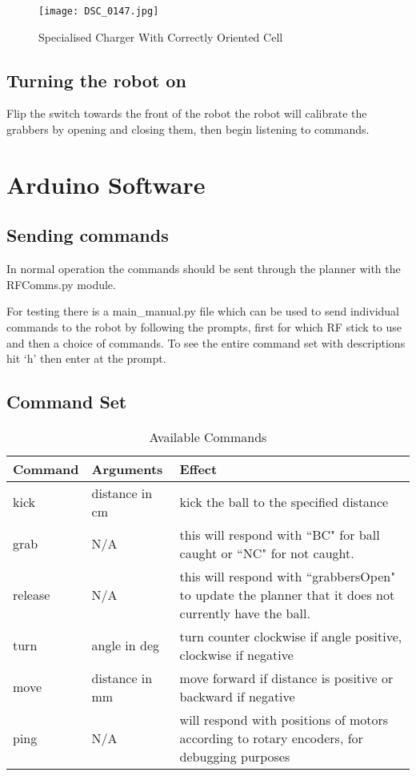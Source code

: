\begin{figure}[H]
\centering
\texttt{[image: DSC\_0147.jpg]}
\caption{Specialised Charger With Correctly Oriented Cell}
\label{fig:charger}
\end{figure}


\subsection{Turning the robot on}
Flip the switch towards the front of the robot the robot will calibrate the grabbers by opening and closing them, then begin listening to commands.

\section{Arduino Software}
\subsection{Sending commands}
In normal operation the commands should be sent through the planner with the RFComms.py module. 

For testing there is a main\_manual.py file which can be used to send individual commands to the robot by following the 
prompts, first for which RF stick to use and then a choice of commands. To see the entire command set  with descriptions hit `h' then enter at the prompt. 

\subsection{Command Set}
\begin{table}[H]
\begin{tabularx}{\textwidth}{ llX }
\toprule
\textbf{Command} & \textbf{Arguments} & \textbf{Effect} \\
\midrule
kick & distance in cm & kick the ball to the specified distance\\
grab & N/A & this will respond with ``BC" for ball caught or ``NC" for not caught. \\
release & N/A & this will respond with ``grabbersOpen" to update the planner that it does not currently have the ball. \\
turn & angle in deg & turn counter clockwise if angle positive, clockwise if negative\\
move & distance in mm & move forward if distance is positive or backward if negative \\
ping & N/A &  will respond with positions of motors according to rotary encoders, for debugging purposes \\
\bottomrule
\end{tabularx}
\caption{Available Commands}
\end{table}

